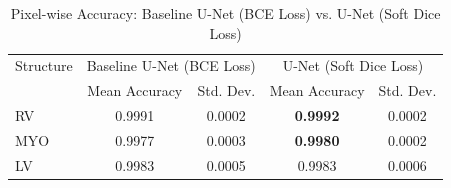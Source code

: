 \documentclass{article}
\begin{document}
\begin{table}[H]
  \centering
  \caption{Pixel-wise Accuracy: Baseline U-Net (BCE Loss) vs. U-Net (Soft Dice Loss)}
  \label{tab:soft_dice_unet_accuracy}
  \begin{tabular}{l|cc|cc}
    \toprule
    Structure & \multicolumn{2}{c|}{Baseline U-Net (BCE Loss)} & \multicolumn{2}{c}{U-Net (Soft Dice Loss)}                               \\
              & Mean Accuracy                                  & Std. Dev.                                  & Mean Accuracy   & Std. Dev. \\
    \midrule
    RV        & 0.9991                                         & 0.0002                                     & \textbf{0.9992} & 0.0002    \\
    MYO       & 0.9977                                         & 0.0003                                     & \textbf{0.9980} & 0.0002    \\
    LV        & 0.9983                                         & 0.0005                                     & 0.9983          & 0.0006    \\
    \bottomrule
  \end{tabular}
\end{table}
\end{document}
